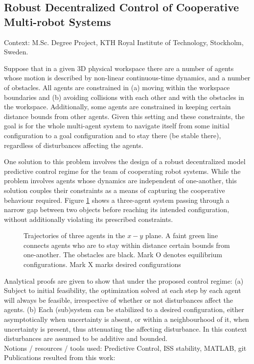 \subsection{Robust Decentralized Control of Cooperative Multi-robot Systems}

Context: M.Sc. Degree Project, KTH Royal Institute of Technology, Stockholm, Sweden.\\

\begin{problem}
Suppose that in a given 3D physical workspace there are a number of agents
whose motion is described by non-linear continuous-time dynamics, and a
number of obstacles. All agents are constrained in (a) moving within the
workspace boundaries and (b) avoiding collisions with each other and with the
obstacles in the workspace. Additionally, some agents are constrained in
keeping certain distance bounds from other agents. Given this setting and
these constraints, the goal is for the whole multi-agent system to navigate
itself from some initial configuration to a goal configuration and to stay
there (be stable there), regardless of disturbances affecting the agents.
\end{problem}

One solution to this problem involves the design of a robust decentralized
model predictive control regime for the team of cooperating robot systems.
While the problem involves agents whose dynamics are independent of
one-another, this solution couples their constraints as a means of capturing
the cooperative behaviour required. Figure \ref{fig:d_OFF_res_trajectory_3_2}
shows a three-agent system passing through a narrow gap between two objects
before reaching its intended configuration, without additionally violating its
prescribed constraints.

\begin{figure}[H]\centering
  \scalebox{0.8}{}
  \caption{\small Trajectories of three agents in the $x-y$ plane. A faint
           green line connects agents who are to stay within distance certain
           bounds from one-another. The obstacles are black. Mark O denotes
           equilibrium configurations. Mark X marks desired configurations}
  \label{fig:d_OFF_res_trajectory_3_2}
\end{figure}

Analytical proofs are given to show that under the proposed control regime: (a)
Subject to initial feasibility, the optimization solved at each step by each
agent will always be feasible, irrespective of whether or not disturbances
affect the agents. (b) Each (sub)system can be stabilized to a desired
configuration, either asymptotically when uncertainty is absent, or within a
neighbourhood of it, when uncertainty is present, thus attenuating the
affecting disturbance. In this context disturbances are assumed to be additive
and bounded.\\

Notions / resources / tools used: Predictive Control, ISS stability, MATLAB, git\\

Publications resulted from this work: \cite{Filotheou2018,Filotheou2020}
